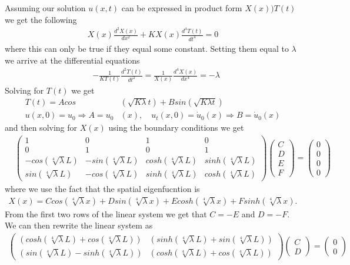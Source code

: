 \documentclass[12pt]{article}
\theoremstyle{remark}
\begin{document}
Assuming our solution $u(x,t)$ can be expressed in product form $X(x))T(t)$ we get the following
\begin{align*}
	X(x)\frac{d^2X(x)}{dx^2} + KX(x)\frac{d^4T(t)}{dt^4} = 0
\end{align*}
where this can only be true if they equal some constant. Setting them equal to $\lambda$ we arrive at the differential equations
\begin{align*}
	& -\frac{1}{KT(t)}\frac{d^2T(t)}{dt^2} = \frac{1}{X(x)}\frac{d^4X(x)}{dx^4} = -\lambda
\end{align*}
Solving for $T(t)$ we get
\begin{align*}
	T(t) = Acos&(\sqrt{K\lambda}t) + Bsin(\sqrt{K\lambda t}) \\
	u(x,0) = u_0 \Rightarrow A = u_0&(x), \quad u_t(x,0) = \dot{u}_0(x) \Rightarrow B = \dot{u}_0(x)
\end{align*}
and then solving for $X(x)$ using the boundary conditions we get
\begin{align*} 
&\begin{pmatrix}
	1 & 0 & 1 & 0 \\
	0 & 1 & 0 & 1 \\
	-cos(\sqrt[4]{\lambda}L) & -sin(\sqrt[4]{\lambda}L) & cosh(\sqrt[4]{\lambda}L) & sinh(\sqrt[4]{\lambda}L) \\
	sin(\sqrt[4]{\lambda}L) & -cos(\sqrt[4]{\lambda}L) & 
	sinh(\sqrt[4]{\lambda}L) & cosh(\sqrt[4]{\lambda}L)
\end{pmatrix}
\begin{pmatrix}
C \\ D \\ E \\ F
\end{pmatrix} =
\begin{pmatrix}
0 \\ 0 \\ 0 \\ 0
\end{pmatrix}
\end{align*}
where we use the fact that the spatial eigenfucntion is 
\begin{align*}
	X(x) = Ccos(\sqrt[4]{\lambda}x) + Dsin(\sqrt[4]{\lambda}x) + Ecosh(\sqrt[4]{\lambda}x) + Fsinh(\sqrt[4]{\lambda}x).
\end{align*}
From the first two rows of the linear system we get that $C = -E$ and $D = -F$. We can then rewrite the linear system as 
\begin{align*}
\begin{pmatrix}
(cosh(\sqrt[4]{\lambda}L) + cos(\sqrt[4]{\lambda}L)) & (sinh(\sqrt[4]{\lambda}L) + sin(\sqrt[4]{\lambda}L)) \\
(sin(\sqrt[4]{\lambda}L) - sinh(\sqrt[4]{\lambda}L)) & (cosh(\sqrt[4]{\lambda}L) + cos(\sqrt[4]{\lambda}L))
\end{pmatrix}
\begin{pmatrix}
C \\ D
\end{pmatrix} = 
\begin{pmatrix}
0 \\ 0
\end{pmatrix}
\end{align*}
\end{document}
